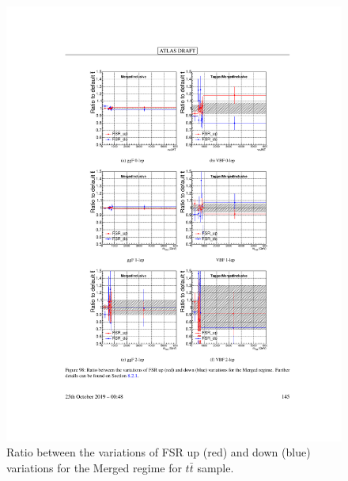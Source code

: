 \begin{figure}[h!]
  \centering
  \includegraphics[width=\hsize]{figures/Analysis/modelingsysts/ttbar_fsr_merg.pdf}
            \caption{Ratio between the variations of FSR up (red) and down (blue) variations for the Merged regime for $t\bar{t}$ sample.} 
  \label{fig:ttbar_fsr_merg}
\end{figure} 
\FloatBarrier


